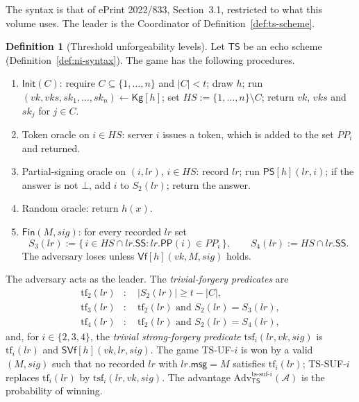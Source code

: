 \documentclass[11pt,a4paper]{article}
\theoremstyle{definition}
\newtheorem{definition}[theorem]{Definition}
\newcommand{\Adv}{\mathcal{A}}
\begin{document}
The syntax is that of ePrint 2022/833, Section~3.1, restricted to what this
volume uses. The leader is the Coordinator of
Definition~\ref{def:ts-scheme}.

\begin{definition}[Threshold unforgeability levels]\label{def:ts-uf}
Let \(\mathsf{TS}\) be an echo scheme (Definition~\ref{def:ni-syntax}). The
game has the following procedures.
\begin{enumerate}
\item[] \(\mathsf{Init}(C)\): require \(C \subseteq \{1, \dots, n\}\) and
  \(\lvert C \rvert < t\); draw \(h\); run
  \((\mathit{vk}, \mathit{vks}, \mathit{sk}_1, \dots, \mathit{sk}_n)
  \gets \mathsf{Kg}[h]\); set \(\mathit{HS} := \{1, \dots, n\} \setminus C\);
  return \(\mathit{vk}\), \(\mathit{vks}\) and \(\mathit{sk}_j\) for
  \(j \in C\).
\item[] Token oracle on \(i \in \mathit{HS}\): server \(i\) issues a token,
  which is added to the set \(\mathit{PP}_i\) and returned.
\item[] Partial-signing oracle on \((i, \mathit{lr})\), \(i \in \mathit{HS}\):
  record \(\mathit{lr}\); run \(\mathsf{PS}[h](\mathit{lr}, i)\); if the
  answer is not \(\bot\), add \(i\) to \(S_2(\mathit{lr})\); return the
  answer.
\item[] Random oracle: return \(h(x)\).
\item[] \(\mathsf{Fin}(M, \mathit{sig})\): for every recorded
  \(\mathit{lr}\) set
  \[
    S_3(\mathit{lr}) := \{\, i \in \mathit{HS} \cap \mathit{lr}.\mathsf{SS}
      : \mathit{lr}.\mathsf{PP}(i) \in \mathit{PP}_i \,\} , \qquad
    S_4(\mathit{lr}) := \mathit{HS} \cap \mathit{lr}.\mathsf{SS} .
  \]
  The adversary loses unless \(\mathsf{Vf}[h](\mathit{vk}, M,
  \mathit{sig})\) holds.
\end{enumerate}
The adversary acts as the leader. The \emph{trivial-forgery predicates} are
\begin{align*}
  \mathrm{tf}_2(\mathit{lr}) &:\quad
    \lvert S_2(\mathit{lr}) \rvert \ge t - \lvert C \rvert , \\
  \mathrm{tf}_3(\mathit{lr}) &:\quad
    \mathrm{tf}_2(\mathit{lr}) \text{ and }
    S_2(\mathit{lr}) = S_3(\mathit{lr}) , \\
  \mathrm{tf}_4(\mathit{lr}) &:\quad
    \mathrm{tf}_2(\mathit{lr}) \text{ and }
    S_2(\mathit{lr}) = S_4(\mathit{lr}) ,
\end{align*}
and, for \(i \in \{2, 3, 4\}\), the \emph{trivial strong-forgery predicate}
\(\mathrm{tsf}_i(\mathit{lr}, \mathit{vk}, \mathit{sig})\) is
\(\mathrm{tf}_i(\mathit{lr})\) and
\(\mathsf{SVf}[h](\mathit{vk}, \mathit{lr}, \mathit{sig})\). The game
TS-UF-\(i\) is won by a valid \((M, \mathit{sig})\) such that no recorded
\(\mathit{lr}\) with \(\mathit{lr}.\mathsf{msg} = M\) satisfies
\(\mathrm{tf}_i(\mathit{lr})\); TS-SUF-\(i\) replaces
\(\mathrm{tf}_i(\mathit{lr})\) by
\(\mathrm{tsf}_i(\mathit{lr}, \mathit{vk}, \mathit{sig})\). The advantage
\(\mathrm{Adv}^{\mathrm{ts\text{-}suf\text{-}}i}_{\mathsf{TS}}(\Adv)\) is
the probability of winning.
\end{definition}
\end{document}
